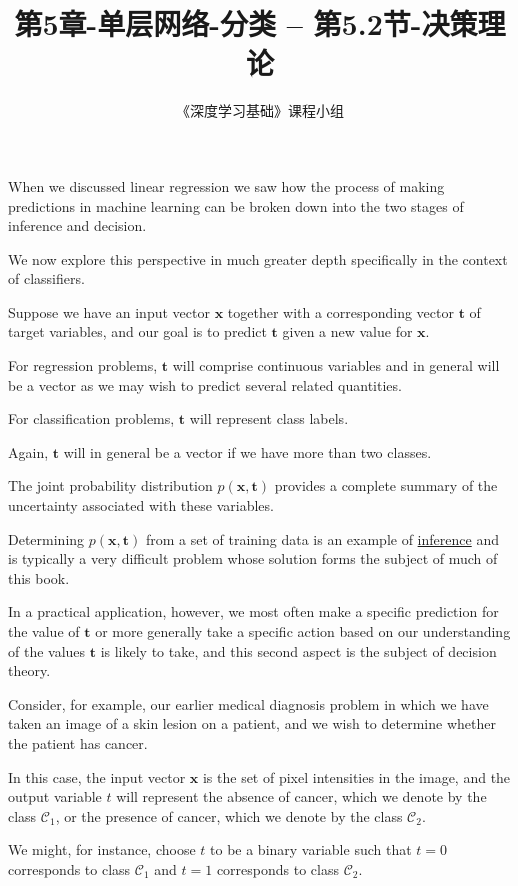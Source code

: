 \documentclass{article}
\title{第5章-单层网络-分类 -- 第5.2节-决策理论}%
\author{《深度学习基础》课程小组}
\begin{document}
\maketitle
\tableofcontents

When we discussed linear regression we saw how the process of making predictions in machine learning can be broken down into the two stages of inference and decision. 

We now explore this perspective in much greater depth specifically in the context of classifiers.

Suppose we have an input vector $\mathbf{x}$ together with a corresponding vector $\mathbf{t}$ of target variables, and our goal is to predict $\mathbf{t}$ given a new value for $\mathbf{x}$. 

For regression problems, $\mathbf{t}$ will comprise continuous variables and in general will be a vector as we may wish to predict several related quantities. 

For classification problems, $\mathbf{t}$ will represent class labels. 

Again, $\mathbf{t}$ will in general be a vector if we have more than two classes. 

The joint probability distribution $p(\mathbf{x}, \mathbf{t})$ provides a complete summary of the uncertainty associated with these variables. 

Determining $p(\mathbf{x}, \mathbf{t})$ from a set of training data is an example of \underline{\color{red}inference} and is typically a very difficult problem whose solution forms the subject of much of this book. 

In a practical application, however, we most often make a specific prediction for the value of $\mathbf{t}$ or more generally take a specific action based on our understanding of the values $\mathbf{t}$ is likely to take, and this second aspect is the subject of decision theory.

Consider, for example, our earlier medical diagnosis problem in which we have taken an image of a skin lesion on a patient, and we wish to determine whether the patient has cancer. 

In this case, the input vector $\mathbf{x}$ is the set of pixel intensities in the image, and the output variable $t$ will represent the absence of cancer, which we denote by the class $\mathcal{C}_{1}$, or the presence of cancer, which we denote by the class $\mathcal{C}_{2}$. 

We might, for instance, choose $t$ to be a binary variable such that $t=0$ corresponds to class $\mathcal{C}_{1}$ and $t=1$ corresponds to class $\mathcal{C}_{2}$. 
\end{document}
